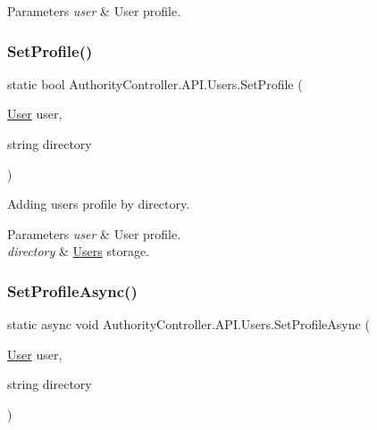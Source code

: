 \begin{DoxyParams}{Parameters}
{\em user} & User profile.\\
\hline
\end{DoxyParams}
\mbox{\label{class_authority_controller_1_1_a_p_i_1_1_users_a6896c020fbcaf19c54962c7c769502e4}} 
\subsubsection{\texorpdfstring{Set\+Profile()}{SetProfile()}\hspace{0.1cm}{\footnotesize\ttfamily [2/2]}}
{\footnotesize\ttfamily static bool Authority\+Controller.\+A\+P\+I.\+Users.\+Set\+Profile (\begin{DoxyParamCaption}\item[{\mbox{\hyperlink{class_authority_controller_1_1_data_1_1_personal_1_1_user}{User}}}]{user,  }\item[{string}]{directory }\end{DoxyParamCaption})\hspace{0.3cm}{\ttfamily [static]}}



Adding user\textquotesingle{}s profile by directory. 


\begin{DoxyParams}{Parameters}
{\em user} & User profile.\\
\hline
{\em directory} & \mbox{\hyperlink{class_authority_controller_1_1_a_p_i_1_1_users}{Users}} storage.\\
\hline
\end{DoxyParams}
\mbox{\label{class_authority_controller_1_1_a_p_i_1_1_users_a3ed2ca9e5bb026c907894da4160b5e5e}} 
\subsubsection{\texorpdfstring{Set\+Profile\+Async()}{SetProfileAsync()}}
{\footnotesize\ttfamily static async void Authority\+Controller.\+A\+P\+I.\+Users.\+Set\+Profile\+Async (\begin{DoxyParamCaption}\item[{\mbox{\hyperlink{class_authority_controller_1_1_data_1_1_personal_1_1_user}{User}}}]{user,  }\item[{string}]{directory }\end{DoxyParamCaption})\hspace{0.3cm}{\ttfamily [static]}}



